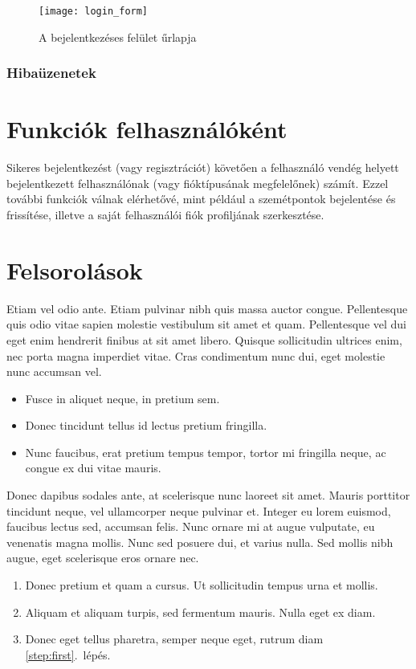 \begin{figure}[H]
	\centering
	\texttt{[image: login\_form]}
	\caption{A bejelentkezéses felület űrlapja}
	\label{fig:login_form}
\end{figure}


\subsubsection{Hibaüzenetek}

\section{Funkciók felhasználóként}

Sikeres bejelentkezést (vagy regisztrációt) követően a felhasználó vendég helyett bejelentkezett felhasználónak (vagy fióktípusának megfelelőnek) számít. Ezzel további funkciók válnak elérhetővé, mint például a szemétpontok bejelentése és frissítése, illetve a saját felhasználói fiók profiljának szerkesztése.

\section{Felsorolások}

Etiam vel odio ante. Etiam pulvinar nibh quis massa auctor congue. Pellentesque quis odio vitae sapien molestie vestibulum sit amet et quam. Pellentesque vel dui eget enim hendrerit finibus at sit amet libero. Quisque sollicitudin ultrices enim, nec porta magna imperdiet vitae. Cras condimentum nunc dui, eget molestie nunc accumsan vel.

\begin{itemize}
	\item Fusce in aliquet neque, in pretium sem.
	\item Donec tincidunt tellus id lectus pretium fringilla.
	\item Nunc faucibus, erat pretium tempus tempor, tortor mi fringilla neque, ac congue ex dui vitae mauris.
\end{itemize}

Donec dapibus sodales ante, at scelerisque nunc laoreet sit amet. Mauris porttitor tincidunt neque, vel ullamcorper neque pulvinar et. Integer eu lorem euismod, faucibus lectus sed, accumsan felis. Nunc ornare mi at augue vulputate, eu venenatis magna mollis. Nunc sed posuere dui, et varius nulla. Sed mollis nibh augue, eget scelerisque eros ornare nec.

\begin{enumerate}
	\item\label{step:first} Donec pretium et quam a cursus. Ut sollicitudin tempus urna et mollis.
	\item Aliquam et aliquam turpis, sed fermentum mauris. Nulla eget ex diam.
	\item Donec eget tellus pharetra, semper neque eget, rutrum diam \ref{step:first}.~lépés.
\end{enumerate}

